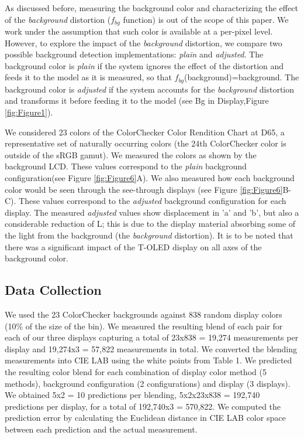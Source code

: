 \documentclass[annual]{acmsiggraph}
\begin{document}
As discussed before, measuring the background color and characterizing the effect of the \textit{background} distortion ($f_{bg}$ function) is out of the scope of this paper. We work under the assumption that such color is available at a per-pixel level. However, to explore the impact of the \textit{background} distortion, we compare two possible background detection implementations: \textit{plain} and \textit{adjusted}. The background color is \textit{plain} if the system ignores the effect of the distortion and feeds it to the model as it is measured, so that $f_{bg}$(background)=background. The background color is \textit{adjusted} if the system accounts for the \textit{background} distortion and transforms it before feeding it to the model (see Bg in Display,Figure \ref{fig:Figure1}).

We considered 23 colors of the ColorChecker Color Rendition Chart  at D65, a representative set of naturally occurring colors (the 24th ColorChecker color is outside of the sRGB gamut). We measured the colors as shown by the background LCD. These values correspond to the \textit{plain} background configuration(see Figure \ref{fig:Figure6}A). We also measured how each background color would be seen through the see-through displays (see Figure \ref{fig:Figure6}B-C). These values correspond to the \textit{adjusted}  background configuration for each display. The measured \textit{adjusted} values show displacement in 'a' and 'b', but also a considerable reduction of L; this is due to the display material absorbing some of the light from the background (the \textit{background} distortion). It is to be noted that there was a significant impact of the T-OLED display on all axes of the background color.

\subsection{Data Collection}
We used the 23 ColorChecker backgrounds against 838 random display colors (10\% of the size of the bin). We measured the resulting blend of each pair for each of our three displays capturing a total of 23x838 = 19,274 measurements per display and 19,274x3 = 57,822 measurements in total. We converted the blending measurements into CIE LAB using the white points from Table 1. We predicted the resulting color blend for each combination of display color method (5 methods), background configuration (2 configurations) and display (3 displays). We obtained 5x2 = 10 predictions per blending, 5x2x23x838 = 192,740 predictions per display, for a total of 192,740x3 = 570,822. We computed the prediction error by calculating the Euclidean distance in CIE LAB color space between each prediction and the actual measurement.
\end{document}

